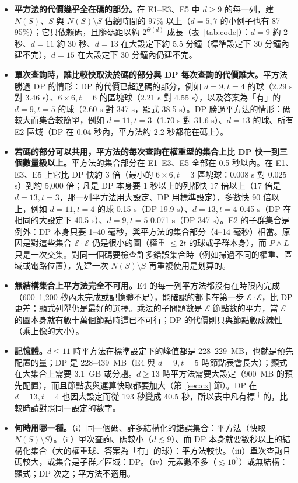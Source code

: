 \documentclass[a4paper,11pt,fontset=none]{ctexart}
\newcommand{\E}{\mathcal{E}}
\theoremstyle{definition}
\begin{document}
\begin{itemize}[leftmargin=1.5em]
\item \textbf{平方法的代價幾乎全在碼的部分。}在 E1--E3、E5 中 $d\ge9$ 的每一列，建 $N(S)$、$S$ 與 $N(S)\setminus S$ 佔總時間的 97\% 以上（$d=5,7$ 的小例子也有 87--95\%）；它只依賴碼，且隨碼距以約 $2^{\Theta(d)}$ 成長（表~\ref{tab:code}）：$d{=}9$ 約 2 秒、$d{=}11$ 約 30 秒、$d{=}13$ 在大設定下約 5.5 分鐘（標準設定下 30 分鐘內建不完），$d{=}15$ 在大設定下 30 分鐘內仍建不完。
\item \textbf{單次查詢時，誰比較快取決於碼的部分與 DP 每次查詢的代價誰大。}平方法勝過 DP 的情形：DP 的代價已超過碼的部分，例如 $d{=}9,t{=}4$ 的球（2.29 s 對 3.46 s）、$6\times6,t{=}6$ 的區塊球（2.21 s 對 4.55 s），以及答案為「有」的 $d{=}9,t{=}5$ 的球（2.60 s 對 347 s，顯式 38.5 s）。DP 勝過平方法的情形：碼較大而集合較簡單，例如 $d{=}11,t{=}3$（1.70 s 對 31.6 s）、$d{=}13$ 的球、所有 E2 區域（DP 在 0.04 秒內，平方法約 2.2 秒都花在碼上）。
\item \textbf{若碼的部分可以共用，平方法的每次查詢在權重型的集合上比 DP 快一到三個數量級以上。}平方法的集合部分在 E1--E3、E5 全部在 0.5 秒以內。在 E1、E3、E5 上它比 DP 快約 3 倍（最小的 $6\times6,t{=}3$ 區塊球：0.008 s 對 0.025 s）到約 5,000 倍；凡是 DP 本身要 1 秒以上的列都快 17 倍以上（17 倍是 $d{=}13,t{=}3$，那一列平方法用大設定、DP 用標準設定），多數快 90 倍以上，例如 $d{=}11,t{=}4$ 的球 0.15 s（DP 19.9 s）、$d{=}13,t{=}4$ 0.45 s（DP 在相同的大設定下 40.5 s）、$d{=}9,t{=}5$ 0.071 s（DP 347 s）。E2 的子群集合是例外：DP 本身只要 1--40 毫秒，與平方法的集合部分（4--14 毫秒）相當。原因是對這些集合 $\E\cdot\E$ 仍是很小的圖（權重 $\le2t$ 的球或子群本身），而 $P\wedge L$ 只是一次交集。對同一個碼要檢查許多錯誤集合時（例如掃過不同的權重、區域或電路位置），先建一次 $N(S)\setminus S$ 再重複使用是划算的。
\item \textbf{無結構集合上平方法完全不可用。}E4 的每一列平方法都沒有在時限內完成（600--1,200 秒內未完成或記憶體不足），能確認的都卡在第一步 $\E\cdot\E$，比 DP 更差；顯式列舉仍是最好的選擇。乘法的子問題數是 $\E$ 節點數的平方，當 $\E$ 的圖本身就有數十萬個節點時這已不可行；DP 的代價則只與節點數成線性（乘上像的大小）。
\item \textbf{記憶體。}$d\le11$ 時平方法在標準設定下的峰值都是 228--229~MB，也就是預先配置的量；DP 是 228--439~MB（E4 與 $d{=}9,t{=}5$ 時節點表會長大）；顯式在大集合上需要 3.1~GB 或分趟。$d\ge13$ 時平方法需要大設定（900~MB 的預先配置），而且節點表與運算快取都要加大（第~\ref{sec:cx} 節）。DP 在 $d{=}13,t{=}4$ 也因大設定而從 193 秒變成 40.5 秒，所以表中凡有標 $^\dagger$ 的，比較時請對照同一設定的數字。
\item \textbf{何時用哪一種。}（i）同一個碼、許多結構化的錯誤集合：平方法（快取 $N(S)\setminus S$）。（ii）單次查詢、碼較小（$d\lesssim9$）、而 DP 本身就要數秒以上的結構化集合（大的權重球、答案為「有」的球）：平方法較快。（iii）單次查詢且碼較大，或集合是子群／區域：DP。（iv）元素數不多（$\lesssim10^7$）或無結構：顯式；DP 次之；平方法不適用。
\end{itemize}
\end{document}
